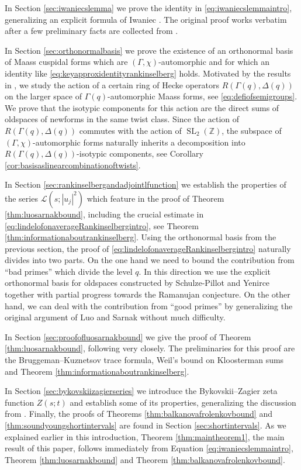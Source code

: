 \documentclass{article}
\theoremstyle{named}
\newcommand{\Z}{\mathbb{Z}}
\renewcommand{\L}{\mathcal{L}}
\DeclareMathOperator{\SL}{SL}
\begin{document}
In Section \ref{sec:iwaniecslemma} we prove the identity in \eqref{eq:iwaniecslemmaintro}, generalizing an explicit formula of Iwaniec \cite[Lemma 1]{Iwaniec1984}. The original proof works verbatim after a few preliminary facts are collected from \cite{hejhal2}. 

In Section \ref{sec:orthonormalbasis} we prove the existence of an orthonormal basis of Maass cuspidal forms which are $(\Gamma, \chi)$-automorphic and for which an identity like \eqref{eq:keyapproxidentityrankinselberg} holds. Motivated by the results in \cite[Chapter 3]{shimurabook}, we study the action of a certain ring of Hecke operators $R(\Gamma(q), \Delta(q))$ on the larger space of $\Gamma(q)$-automorphic Maass forms, see \eqref{eq:defiofsemigroups}. We prove that the isotypic components for this action are the direct sums of oldspaces of newforms in the same twist class. Since the action of $R(\Gamma(q), \Delta(q))$ commutes with the action of $\SL_2(\Z)$, the subspace of $(\Gamma, \chi)$-automorphic forms naturally inherits a decomposition into $R(\Gamma(q), \Delta(q))$-isotypic components, see Corollary \ref{cor:basisaslinearcombinationoftwists}. 

In Section \ref{sec:rankinselbergandadjointlfunction} we establish the properties of the series $\L(s; |u_j|^2)$ which feature in the proof of Theorem \ref{thm:luosarnakbound}, including the crucial estimate in \eqref{eq:lindelofonaverageRankinselbergintro}, see Theorem \ref{thm:informationaboutrankinselberg}. Using the orthonormal basis from the previous section, the proof of \eqref{eq:lindelofonaverageRankinselbergintro} naturally divides into two parts. On the one hand we need to bound the contribution from ``bad primes'' which divide the level $q$. In this direction we use the explicit orthonormal basis for oldspaces constructed by Schulze-Pillot and Yenirce \cite{Schulze_Pillot_Petersson} together with partial progress towards the Ramanujan conjecture. On the other hand, we can deal with the contribution from ``good primes'' by generalizing the original argument of Luo and Sarnak without much difficulty.

In Section \ref{sec:proofofluosarnakbound} we give the proof of Theorem \ref{thm:luosarnakbound}, following \cite{luosarnak} very closely. The preliminaries for this proof are the Bruggeman--Kuznetsov trace formula, Weil's bound on Kloosterman sums and Theorem \ref{thm:informationaboutrankinselberg}.

In Section \ref{sec:bykovskiizagierseries} we introduce the Bykovskii--Zagier zeta function $Z(s; t)$ and establish some of its properties, generalizing the discussion from \cite{Soundararajan_2013}. Finally, the proofs of Theorems \ref{thm:balkanovafrolenkovbound} and \ref{thm:soundyoungshortintervals} are found in Section \ref{sec:shortintervals}. As we explained earlier in this introduction, Theorem \ref{thm:maintheorem1}, the main result of this paper, follows immediately from Equation \eqref{eq:iwaniecslemmaintro}, Theorem \ref{thm:luosarnakbound} and Theorem \ref{thm:balkanovafrolenkovbound}.
\end{document}
